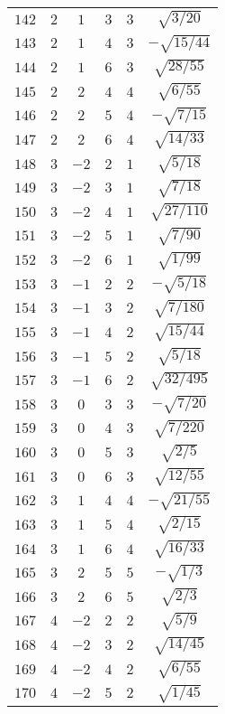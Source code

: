 \begin{table}
\begin{center}
\begin{tabular}{|c|c|c|c|c|c|}
$142$ & $2$ & $1$ & $3$ & $3$ & $\sqrt{3/20}$ \\ 
$143$ & $2$ & $1$ & $4$ & $3$ & $-\sqrt{15/44}$ \\ 
$144$ & $2$ & $1$ & $6$ & $3$ & $\sqrt{28/55}$ \\ 
$145$ & $2$ & $2$ & $4$ & $4$ & $\sqrt{6/55}$ \\ 
$146$ & $2$ & $2$ & $5$ & $4$ & $-\sqrt{7/15}$ \\ 
$147$ & $2$ & $2$ & $6$ & $4$ & $\sqrt{14/33}$ \\ 
$148$ & $3$ & $-2$ & $2$ & $1$ & $\sqrt{5/18}$ \\ 
$149$ & $3$ & $-2$ & $3$ & $1$ & $\sqrt{7/18}$ \\ 
$150$ & $3$ & $-2$ & $4$ & $1$ & $\sqrt{27/110}$ \\ 
$151$ & $3$ & $-2$ & $5$ & $1$ & $\sqrt{7/90}$ \\ 
$152$ & $3$ & $-2$ & $6$ & $1$ & $\sqrt{1/99}$ \\ 
$153$ & $3$ & $-1$ & $2$ & $2$ & $-\sqrt{5/18}$ \\ 
$154$ & $3$ & $-1$ & $3$ & $2$ & $\sqrt{7/180}$ \\ 
$155$ & $3$ & $-1$ & $4$ & $2$ & $\sqrt{15/44}$ \\ 
$156$ & $3$ & $-1$ & $5$ & $2$ & $\sqrt{5/18}$ \\ 
$157$ & $3$ & $-1$ & $6$ & $2$ & $\sqrt{32/495}$ \\ 
$158$ & $3$ & $0$ & $3$ & $3$ & $-\sqrt{7/20}$ \\ 
$159$ & $3$ & $0$ & $4$ & $3$ & $\sqrt{7/220}$ \\ 
$160$ & $3$ & $0$ & $5$ & $3$ & $\sqrt{2/5}$ \\ 
$161$ & $3$ & $0$ & $6$ & $3$ & $\sqrt{12/55}$ \\ 
$162$ & $3$ & $1$ & $4$ & $4$ & $-\sqrt{21/55}$ \\ 
$163$ & $3$ & $1$ & $5$ & $4$ & $\sqrt{2/15}$ \\ 
$164$ & $3$ & $1$ & $6$ & $4$ & $\sqrt{16/33}$ \\ 
$165$ & $3$ & $2$ & $5$ & $5$ & $-\sqrt{1/3}$ \\ 
$166$ & $3$ & $2$ & $6$ & $5$ & $\sqrt{2/3}$ \\ 
$167$ & $4$ & $-2$ & $2$ & $2$ & $\sqrt{5/9}$ \\ 
$168$ & $4$ & $-2$ & $3$ & $2$ & $\sqrt{14/45}$ \\ 
$169$ & $4$ & $-2$ & $4$ & $2$ & $\sqrt{6/55}$ \\ 
$170$ & $4$ & $-2$ & $5$ & $2$ & $\sqrt{1/45}$ \\ 

\end{tabular}
\end{center}
\end{table}
